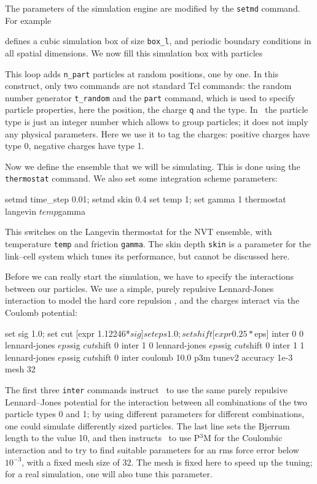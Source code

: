 The parameters of the simulation engine are modified by the \verb|setmd|
command. For example
defines a cubic simulation box of size \verb|box_l|, and periodic boundary
conditions in all spatial dimensions. We now fill this simulation box with
particles
This loop adds \verb|n_part| particles at random positions, one by one.  In this
construct, only two commands are not standard Tcl commands: the random
number generator \verb|t_random| and the \verb|part| command, which is used to
specify particle properties, here the position, the charge \verb|q| and the
type. In \es\ the particle type is just an integer number which allows to group
particles; it does not imply any physical parameters. Here we use it to tag the
charges: positive charges have type 0, negative charges have type 1.

Now we define the ensemble that we will be simulating. This is done using the
\verb|thermostat| command. We also set some integration scheme parameters:
\begin{tclcode}
setmd time_step 0.01; setmd skin 0.4
set temp 1; set gamma 1
thermostat langevin $temp $gamma
\end{tclcode}
This switches on the Langevin thermostat for the NVT ensemble, with temperature
\verb|temp| and friction \verb|gamma|. The skin depth \verb|skin| is a parameter
for the link--cell system which tunes its performance, but cannot be discussed
here.

Before we can really start the simulation, we have to specify the
interactions between our particles.  We use a simple, purely repulsive
Lennard-Jones interaction to model the hard core repulsion
\citep{grest86a}, and the charges interact via the Coulomb potential:
\begin{tclcode}
set sig 1.0; set cut   [expr 1.12246*$sig]
set eps 1.0; set shift [expr 0.25*$eps]
inter 0 0 lennard-jones $eps $sig $cut $shift 0
inter 1 0 lennard-jones $eps $sig $cut $shift 0
inter 1 1 lennard-jones $eps $sig $cut $shift 0
inter coulomb 10.0 p3m tunev2 accuracy 1e-3 mesh 32
\end{tclcode}
The first three \verb|inter| commands instruct \es\ to use the same purely
repulsive Lennard--Jones potential for the interaction between all combinations
of the two particle types 0 and 1; by using different parameters for different
combinations, one could simulate differently sized particles.  The last line sets
the Bjerrum length to the value 10, and then
instructs \es\ to use P$^3$M for the Coulombic interaction and to try to find
suitable parameters for an rms force error below $10^{-3}$, with a fixed mesh
size of 32. The mesh is fixed here to speed up the tuning; for a real
simulation, one will also tune this parameter.

